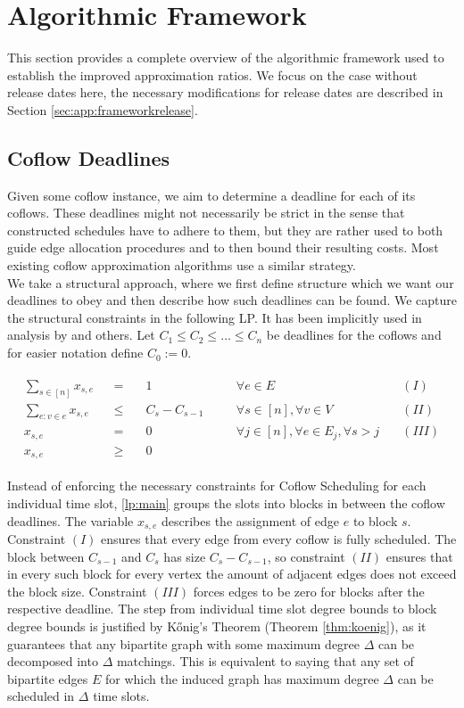 \documentclass[11pt]{article}
\begin{document}
\section{Algorithmic Framework}\label{sec:algframe}
This section provides a complete overview of the algorithmic framework used to establish the improved approximation ratios. We focus on the case without release dates here, the necessary modifications for release dates are described in Section \ref{sec:app:frameworkrelease}.

\subsection{Coflow Deadlines}\label{sec:coflowdead}
Given some coflow instance, we aim to determine a deadline for each of its coflows. These deadlines might not necessarily be strict in the sense that constructed schedules have to adhere to them, but they are rather used to both guide edge allocation procedures and to then bound their resulting costs. Most existing coflow approximation algorithms use a similar strategy.\\
We take a structural approach, where we first define structure which we want our deadlines to obey and then describe how such deadlines can be found. We capture the structural constraints in the following LP. It has been implicitly used in analysis by \cite{im19,fukunaga22} and others. Let $C_1 \le C_2 \le \dotsc \le C_n$ be deadlines for the coflows and for easier notation define $C_0 := 0$.

\begin{gather*}\tag{LP I}\label{lp:main}
\begin{aligned}
\sum_{s \in [n]}x_{s,e} &&=& \quad 1 &&\forall e \in E & (I)\\
\sum_{e: v \in e} x_{s,e} &&\le& \quad C_s - C_{s-1}\quad &&\forall s \in [n],\forall v \in V & (II)\\
x_{s,e} &&=& \quad 0 &&\forall j \in [n], \forall e \in E_j, \forall s > j\quad & (III)\\
x_{s,e} &&\ge&\quad 0
\end{aligned}
\end{gather*}

Instead of enforcing the necessary constraints for Coflow Scheduling for each individual time slot, \ref{lp:main} groups the slots into blocks in between the coflow deadlines. The variable $x_{s,e}$ describes the assignment of edge $e$ to block $s$. Constraint $(I)$ ensures that every edge from every coflow is fully scheduled. The block between $C_{s-1}$ and $C_{s}$ has size $C_{s} - C_{s-1}$, so constraint $(II)$ ensures that in every such block for every vertex the amount of adjacent edges does not exceed the block size. Constraint $(III)$ forces edges to be zero for blocks after the respective deadline. The step from individual time slot degree bounds to block degree bounds is justified by Kőnig's Theorem (Theorem \ref{thm:koenig}), as it guarantees that any bipartite graph with some maximum degree $\Delta$ can be decomposed into $\Delta$ matchings. This is equivalent to saying that any set of bipartite edges $E$ for which the induced graph has maximum degree $\Delta$ can be scheduled in $\Delta$ time slots.\\
\end{document}
